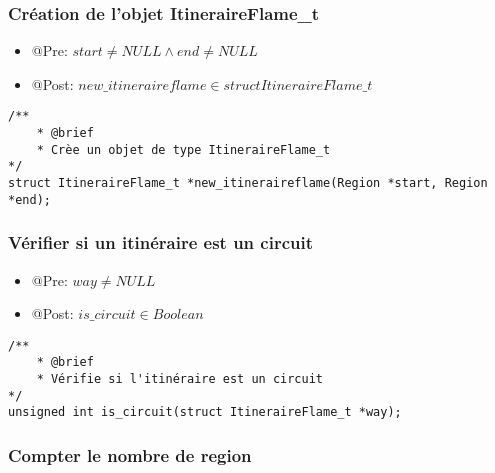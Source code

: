 \subsubsection{Création de l'objet ItineraireFlame\_t}

\begin{itemize}
    \item @Pre: $start \ne NULL \land end \ne NULL$
    \item @Post: $new\_itineraireflame \in struct ItineraireFlame\_t$ 
\end{itemize}

\begin{lstlisting}
/**
    * @brief 
    * Crèe un objet de type ItineraireFlame_t
*/
struct ItineraireFlame_t *new_itineraireflame(Region *start, Region *end);
\end{lstlisting}


\subsubsection{Vérifier si un itinéraire est un circuit}

\begin{itemize}
    \item @Pre: $way \ne NULL$
    \item @Post: $is\_circuit \in Boolean $ 
\end{itemize}

\begin{lstlisting}
/**
    * @brief 
    * Vérifie si l'itinéraire est un circuit
*/
unsigned int is_circuit(struct ItineraireFlame_t *way);
\end{lstlisting}


\subsubsection{Compter le nombre de region}

